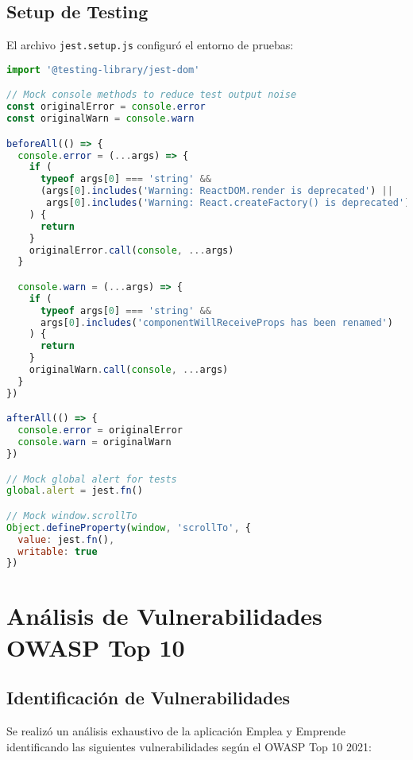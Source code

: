 \documentclass[12pt,a4paper]{article}
\begin{document}
\subsection{Setup de Testing}

El archivo \texttt{jest.setup.js} configuró el entorno de pruebas:

\begin{lstlisting}[language=JavaScript, caption=Setup de Jest]
import '@testing-library/jest-dom'

// Mock console methods to reduce test output noise
const originalError = console.error
const originalWarn = console.warn

beforeAll(() => {
  console.error = (...args) => {
    if (
      typeof args[0] === 'string' &&
      (args[0].includes('Warning: ReactDOM.render is deprecated') ||
       args[0].includes('Warning: React.createFactory() is deprecated'))
    ) {
      return
    }
    originalError.call(console, ...args)
  }

  console.warn = (...args) => {
    if (
      typeof args[0] === 'string' &&
      args[0].includes('componentWillReceiveProps has been renamed')
    ) {
      return
    }
    originalWarn.call(console, ...args)
  }
})

afterAll(() => {
  console.error = originalError
  console.warn = originalWarn
})

// Mock global alert for tests
global.alert = jest.fn()

// Mock window.scrollTo
Object.defineProperty(window, 'scrollTo', {
  value: jest.fn(),
  writable: true
})
\end{lstlisting}

\section{Análisis de Vulnerabilidades OWASP Top 10}

\subsection{Identificación de Vulnerabilidades}

Se realizó un análisis exhaustivo de la aplicación Emplea y Emprende identificando las siguientes vulnerabilidades según el OWASP Top 10 2021:
\end{document}
